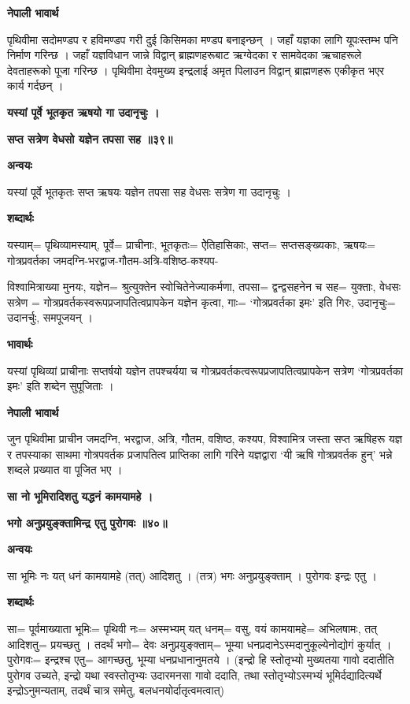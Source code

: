\documentclass[11pt, a5paper]{article}
\begin{document}
\textbf{नेपाली भावार्थ}

पृथिवीमा सदोमण्डप र हविमण्डप गरी दुई किसिमका मण्डप बनाइन्छन् । जहाँ यज्ञका लागि यूपःस्तम्भ पनि निर्माण गरिन्छ । जहाँ यज्ञविधान जान्ने विद्वान् ब्राह्मणहरूबाट ऋग्वेदका र सामवेदका ऋचाहरूले देवताहरूको पूजा गरिन्छ । पृथिवीमा देवमुख्य इन्द्रलाई अमृत पिलाउन विद्वान् ब्राह्मणहरू एकीकृत भएर कार्य गर्दछन् ।

\textbf{यस्यां पूर्वे भूतकृत ऋषयो गा उदानृचुः ।}

\textbf{सप्त सत्रेण वेधसो यज्ञेन तपसा सह ॥३९॥}

\textbf{अन्वयः}

यस्यां पूर्वे भूतकृतः सप्त ऋषयः यज्ञेन तपसा सह वेधसः सत्रेण गा उदानृचुः ।

\textbf{शब्दार्थः}

यस्याम्= पृथिव्यामस्याम्, पूर्वे= प्राचीनाः, भूतकृतः= ऐेतिहासिकाः, सप्त= सप्तसङ्‍ख्यकाः, ऋषयः= गोत्रप्रवर्तका जमदग्नि-भरद्वाज-गौतम-अत्रि-वशिष्ठ-कश्यप-

विश्वामित्राख्या मुनयः, यज्ञेन= श्रुत्युक्तेन स्वोचितेनेज्याकर्मणा, तपसा= द्वन्द्वसहनेन च सह= युक्ताः, वेधसः सत्रेण = गोत्रप्रवर्तकस्वरूपप्रजापतित्वप्रापकेन यज्ञेन कृत्वा, गाः= ‘गोत्रप्रवर्तका इमः’ इति गिरः, उदानृचुः= उदानर्चुः, समपूजयन् ।

\textbf{भावार्थः}

यस्यां पृथिव्यां प्राचीनाः सप्तर्षयो यज्ञेन तपश्चर्यया च गोत्रप्रवर्तकत्वरूपप्रजापतित्वप्रापकेन सत्रेण ‘गोत्रप्रवर्तका इमः’ इति शब्देन सुपूजिताः ।

\textbf{नेपाली भावार्थ}

जुन पृथिवीमा प्राचीन जमदग्नि, भरद्वाज, अत्रि, गौतम, वशिष्ठ, कश्यप, विश्वामित्र जस्ता सप्त ऋषिहरू यज्ञ र तपस्याका साथमा गोत्रपवर्तक प्रजापतित्व प्राप्तिका लागि गरिने यज्ञद्वारा ‘यी ऋषि गोत्रप्रवर्तक हुन्’ भन्ने शब्दले प्रख्यात वा पूजित भए ।

\textbf{सा नो भूमिरादिशतु यद्धनं कामयामहे ।}

\textbf{भगो अनुप्रयुङ्‌क्तामिन्द्र एतु पुरोगवः ॥४०॥}

\textbf{अन्वयः}

सा भूमिः नः यत् धनं कामयामहे (तत्) आदिशतु । (तत्र) भगः अनुप्रयुङ्‌क्ताम्  । पुरोगवः इन्द्रः एतु ।

\textbf{शब्दार्थः}

सा= पूर्वमाख्याता भूमिः= पृथिवी नः= अस्मभ्यम् यत् धनम्= वसु, वयं कामयामहे= अभिलषामः, तत् आदिशतु= प्रयच्छतु । तदर्थं भगो= देवः अनुप्रयुङ्‌क्ताम्= भूम्या धनप्रदानेऽस्मदानुकूल्येनोद्योगं कुर्यात् । पुरोगवः= इन्द्रश्च एतु= आगच्छतु, भूम्या धनप्रधानानुमतये । (इन्द्रो हि स्तोतृभ्यो मुख्यतया गावो ददातीति पुरोगव उच्यते, इन्द्रो यथा स्वस्तोतृभ्यः उदारमनसा गावो ददाति, तथा स्तोतृभ्योऽस्मभ्यं भूमिर्दद्यादित्यर्थे इन्द्रोऽनुमन्यताम्, तदर्थं चात्र समेतु, बलधनयोर्दातृत्वमत्वात्)
\end{document}
